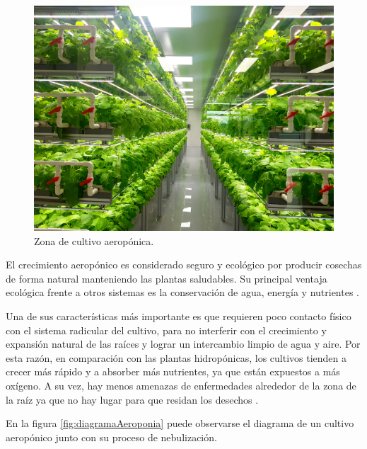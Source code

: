 \begin{figure}[htbp]
	\centering
	\includegraphics[width=.9\textwidth]{./Figures/Zona de cultivo aeroponica.jpg}
	\caption{Zona de cultivo aeropónica\protect\footnotemark.}
	\label{fig:zonaDeCultivoAeroponica}
\end{figure}



El crecimiento aeropónico es considerado seguro y ecológico por producir cosechas de forma natural manteniendo las plantas saludables. Su principal ventaja ecológica frente a otros sistemas es la conservación de agua, energía y nutrientes  \citep{WEBSITE:AEROPONIA2}. 

Una de sus características más importante es que requieren poco contacto físico con el sistema radicular del cultivo, para no interferir con el crecimiento y expansión natural de las raíces y lograr un intercambio limpio de agua y aire. Por esta razón, en comparación con las plantas hidropónicas, los cultivos tienden a crecer más rápido y a absorber más nutrientes, ya que están expuestos a más oxígeno. A su vez, hay menos amenazas de enfermedades alrededor de la zona de la raíz ya que no hay lugar para que residan los desechos \citep{WEBSITE:AEROPONIA3}.

En la figura \ref{fig:diagramaAeroponia} puede observarse el diagrama de un cultivo aeropónico junto con su proceso de nebulización. 


